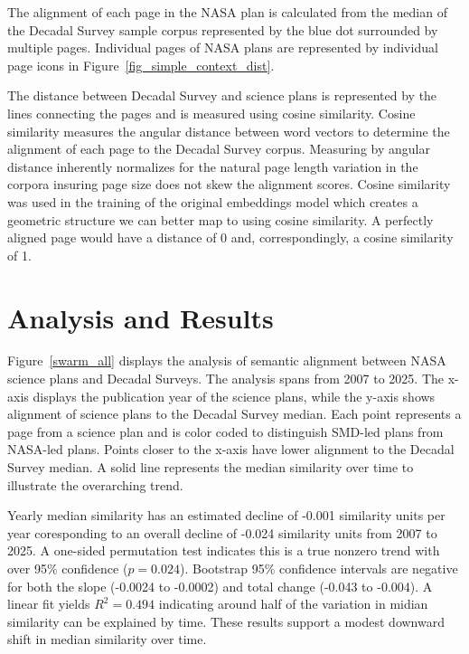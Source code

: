 \documentclass[preprint,12pt]{elsarticle}
\begin{document}
The alignment of each page in the NASA plan is calculated from the median of the Decadal Survey sample corpus represented by the blue dot surrounded by multiple pages. Individual pages of NASA plans are represented by individual page icons in Figure~\ref{fig_simple_context_dist}. 

The distance between Decadal Survey and science plans is represented by the lines connecting the pages and is measured using cosine similarity. Cosine similarity measures the angular distance between word vectors to determine the alignment of each page to the Decadal Survey corpus. Measuring by angular distance inherently normalizes for the natural page length variation in the corpora insuring page size does not skew the alignment scores\cite{manning2008_introduction_ir}. Cosine similarity was used in the training of the original embeddings model\cite{neelakantan2022openAi_embeddings} which creates a geometric structure we can better map to using cosine similarity. A perfectly aligned page would have a distance of 0 and, correspondingly, a cosine similarity of 1.

\section{Analysis and Results} 
\label{anal_results}
Figure~\ref{swarm_all} displays the analysis of semantic alignment between NASA science plans and Decadal Surveys. The analysis spans from 2007 to 2025. The x-axis displays the publication year of the science plans, while the y-axis shows alignment of science plans to the Decadal Survey median. Each point represents a page from a science plan and is color coded to distinguish SMD-led plans from NASA-led plans. Points closer to the x-axis have lower alignment to the Decadal Survey median. A solid line represents the median similarity over time to illustrate the overarching trend. 

Yearly median similarity has an estimated decline of -0.001 similarity units per year coresponding to an overall decline of -0.024 similarity units from 2007 to 2025. A one-sided permutation test indicates this is a true nonzero trend with over 95\% confidence ($p=0.024$). Bootstrap 95\% confidence intervals are negative for both the slope (-0.0024 to -0.0002) and total change (-0.043 to -0.004). A linear fit yields $R^2 = 0.494$ indicating around half of the variation in midian similarity can be explained by time. These results support a modest downward shift in median similarity over time.
\end{document}
